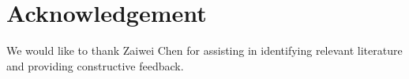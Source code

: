 \section{Acknowledgement}
We would like to thank Zaiwei Chen for assisting in identifying relevant literature and providing constructive feedback.